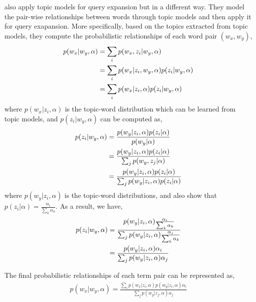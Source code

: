 \cite{Park-2009} also apply topic models for query expansion but in a
different way. They model the pair-wise relationships between words
through topic models and then apply it for query exapansion. More
specifically, based on the topics extracted from topic models, they
compute the probabilistic relationships of each word pair $(w_x,
w_y)$,
\begin{align}
p(w_x|w_y, \alpha) &= \sum_i p(w_x, z_i | w_y, \alpha) \\
&= \sum_i p(w_x | z_i, w_y, \alpha) p(z_i | w_y, \alpha) \notag\\
&= \sum_i p(w_x|z_i, \alpha) p(z_i|w_y, \alpha) \notag
\end{align}
where $p(w_x|z_i, \alpha)$ is the topic-word distribution which can be learned from topic models, and $p(z_i|w_y, \alpha)$ can be computed as,
\begin{align}
p(z_i|w_y, \alpha) &= \frac{p(w_y|z_i,\alpha)p(z_i|\alpha)}{p(w_y|\alpha)} \\
&= \frac{p(w_y|z_i,\alpha)p(z_i|\alpha)}{\sum_j p(w_y, z_j|\alpha)} \notag\\
&= \frac{p(w_y|z_i,\alpha)p(z_i|\alpha)}{\sum_j p(w_y|z_i,\alpha)p(z_i|\alpha)} \notag
\end{align}
where $p(w_y|z_i,\alpha)$ is the topic-word distributions, and \cite{Park-2009} also show that $p(z_i|\alpha) = \frac{\alpha_i}{\sum_k \alpha_k}$.
As a result, we have,
\begin{align}
p(z_i|w_y, \alpha) &= \frac{p(w_y|z_i,\alpha) \frac{\alpha_i}{\sum_k \alpha_k} }{\sum_j p(w_y|z_i,\alpha) \frac{\alpha_j}{\sum_k \alpha_k}} \\
&= \frac{p(w_y|z_i,\alpha) \alpha_i}{\sum_j p(w_y|z_i,\alpha) \alpha_j} \notag
\end{align}

The final probabilistic relationships of each term pair  can be represented as,
\begin{align}
p(w_x|w_y, \alpha) = \frac{\sum_i p(w_x|z_i, \alpha) p(w_y|z_i,\alpha) \alpha_i }{\sum_j p(w_y|z_j,\alpha) \alpha_j}
\end{align}

